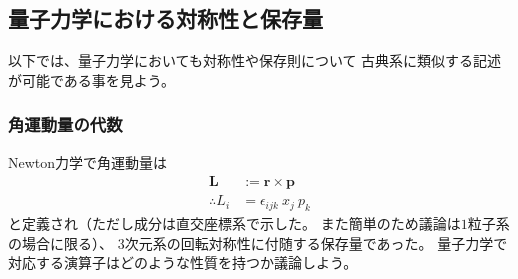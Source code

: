 \subsection{量子力学における対称性と保存量}

以下では、量子力学においても対称性や保存則について
古典系に類似する記述が可能である事を見よう。

\subsubsection{角運動量の代数}
\label{subsubsec: angular momentum}

Newton力学で角運動量は
\begin{subequations}
\begin{align}
    \bm{L} &:= \bm{r} \times \bm{p}
    \\\therefore
    L_i &= \epsilon_{ijk} \ x_j \ p_k
\end{align}
\end{subequations}
と定義され（ただし成分は直交座標系で示した。
また簡単のため議論は$1$粒子系の場合に限る）、
3次元系の回転対称性に付随する保存量であった。
量子力学で対応する演算子はどのような性質を持つか議論しよう。

